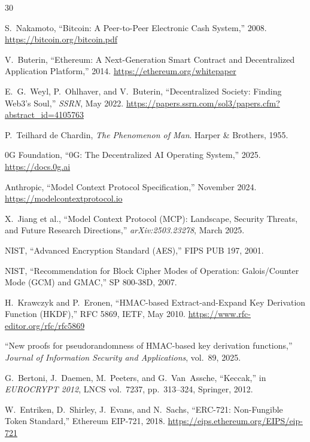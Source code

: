 \documentclass[10pt,a4paper]{article}
\theoremstyle{definition}
\theoremstyle{plain}
\begin{document}
\newpage
\begin{thebibliography}{30}

S.~Nakamoto, ``Bitcoin: A Peer-to-Peer Electronic Cash System,'' 2008.
\url{https://bitcoin.org/bitcoin.pdf}

V.~Buterin, ``Ethereum: A Next-Generation Smart Contract and Decentralized Application Platform,'' 2014.
\url{https://ethereum.org/whitepaper}

E.~G.~Weyl, P.~Ohlhaver, and V.~Buterin, ``Decentralized Society: Finding Web3's Soul,'' \textit{SSRN}, May 2022.
\url{https://papers.ssrn.com/sol3/papers.cfm?abstract_id=4105763}

P.~Teilhard de Chardin, \textit{The Phenomenon of Man}. Harper \& Brothers, 1955.

0G Foundation, ``0G: The Decentralized AI Operating System,'' 2025.
\url{https://docs.0g.ai}

Anthropic, ``Model Context Protocol Specification,'' November 2024.
\url{https://modelcontextprotocol.io}

X.~Jiang et al., ``Model Context Protocol (MCP): Landscape, Security Threats, and Future Research Directions,'' \textit{arXiv:2503.23278}, March 2025.

NIST, ``Advanced Encryption Standard (AES),'' FIPS PUB 197, 2001.

NIST, ``Recommendation for Block Cipher Modes of Operation: Galois/Counter Mode (GCM) and GMAC,'' SP 800-38D, 2007.

H.~Krawczyk and P.~Eronen, ``HMAC-based Extract-and-Expand Key Derivation Function (HKDF),'' RFC 5869, IETF, May 2010.
\url{https://www.rfc-editor.org/rfc/rfc5869}

``New proofs for pseudorandomness of HMAC-based key derivation functions,'' \textit{Journal of Information Security and Applications}, vol.~89, 2025.

G.~Bertoni, J.~Daemen, M.~Peeters, and G.~Van~Assche, ``Keccak,'' in \textit{EUROCRYPT 2012}, LNCS vol.~7237, pp.~313--324, Springer, 2012.

W.~Entriken, D.~Shirley, J.~Evans, and N.~Sachs, ``ERC-721: Non-Fungible Token Standard,'' Ethereum EIP-721, 2018.
\url{https://eips.ethereum.org/EIPS/eip-721}


\end{thebibliography}
\end{document}
